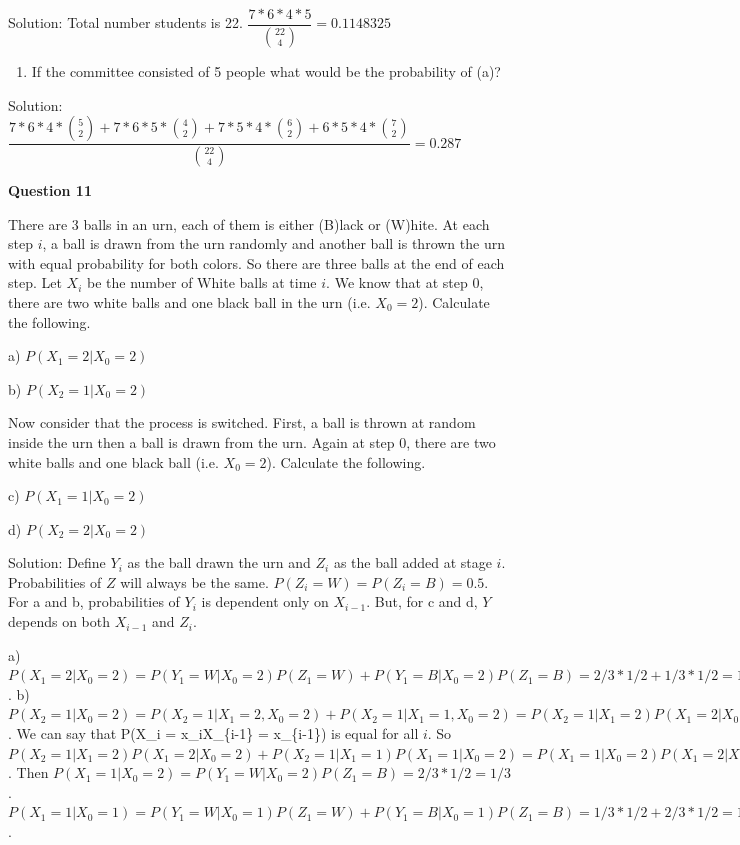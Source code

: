 \documentclass[]{book}
\providecommand{\tightlist}{%
  \setlength{\itemsep}{0pt}\setlength{\parskip}{0pt}}
\theoremstyle{definition}
\theoremstyle{definition}
\theoremstyle{definition}
\theoremstyle{remark}
\begin{document}
Solution: Total number students is 22.
\(\dfrac{7*6*4*5}{\binom{22}{4}} = 0.1148325\)

\begin{enumerate}
\def\labelenumi{\alph{enumi})}
\setcounter{enumi}{1}
\tightlist
\item
  If the committee consisted of 5 people what would be the probability
  of (a)?
\end{enumerate}

Solution:
\(\dfrac{7*6*4*\binom{5}{2} + 7*6*5*\binom{4}{2} + 7*5*4*\binom{6}{2} + 6*5*4*\binom{7}{2}}{\binom{22}{4}} = 0.287\)

\textbf{Question 11}

There are 3 balls in an urn, each of them is either (B)lack or (W)hite.
At each step \(i\), a ball is drawn from the urn randomly and another
ball is thrown the urn with equal probability for both colors. So there
are three balls at the end of each step. Let \(X_i\) be the number of
White balls at time \(i\). We know that at step 0, there are two white
balls and one black ball in the urn (i.e. \(X_0 = 2\)). Calculate the
following.

a) \(P(X_1 = 2 | X_0 = 2)\)

b) \(P(X_2 = 1 | X_0 = 2)\)

Now consider that the process is switched. First, a ball is thrown at
random inside the urn then a ball is drawn from the urn. Again at step
0, there are two white balls and one black ball (i.e. \(X_0 = 2\)).
Calculate the following.

c) \(P(X_1 = 1 | X_0 = 2)\)

d) \(P(X_2 = 2 | X_0 = 2)\)

Solution: Define \(Y_i\) as the ball drawn the urn and \(Z_i\) as the
ball added at stage \(i\). Probabilities of \(Z\) will always be the
same. \(P(Z_i=W) = P(Z_i=B) = 0.5\). For a and b, probabilities of
\(Y_i\) is dependent only on \(X_{i-1}\). But, for c and d, \(Y\)
depends on both \(X_{i-1}\) and \(Z_i\).

a)
\(P(X_1 = 2 | X_0 = 2) = P(Y_1 = W|X_0=2)P(Z_1 = W) + P(Y_1 = B|X_0=2)P(Z_1 = B) = 2/3*1/2 + 1/3*1/2 = 1/2\).
b)
\(P(X_2 = 1|X_0=2) = P(X_2 = 1| X_1 = 2, X_0=2) + P(X_2 = 1| X_1 = 1,X_0=2) = P(X_2=1|X_1=2)P(X_1=2|X_0=2) + P(X_2=1|X_1=1)P(X_1=1|X_0=2)\).
We can say that P(X\_i = x\_i\textbar{}X\_\{i-1\} = x\_\{i-1\}) is equal
for all \(i\). So
\(P(X_2=1|X_1=2)P(X_1=2|X_0=2) + P(X_2=1|X_1=1)P(X_1=1|X_0=2) = P(X_1=1|X_0=2)P(X_1=2|X_0=2) + P(X_1=1|X_0=1)P(X_1=1|X_0=2) = P(X_1=1|X_0=2)(P(X_1=2|X_0=2)+P(X_1=1|X_0=1))\).
Then \(P(X_1=1|X_0=2) = P(Y_1=W|X_0=2)P(Z_1=B) = 2/3*1/2 = 1/3\).
\(P(X_1=1|X_0=1) = P(Y_1 = W|X_0=1)P(Z_1 = W) + P(Y_1 = B|X_0=1)P(Z_1 = B) = 1/3*1/2 + 2/3*1/2 = 1/2\).
\end{document}
